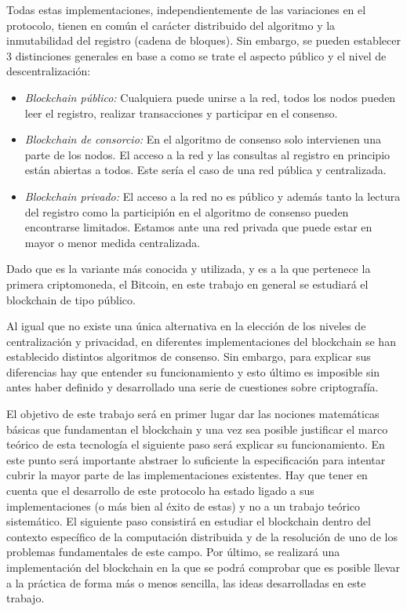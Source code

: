 Todas estas implementaciones, independientemente de las variaciones en el protocolo, tienen en común el carácter distribuido del algoritmo y la inmutabilidad del registro (cadena de bloques). Sin embargo, se pueden establecer 3 distinciones generales en base a como se trate el aspecto público y el nivel de  descentralización:
\begin{itemize}
\item \textit{Blockchain público:} Cualquiera puede unirse a la red, todos los nodos pueden leer el registro, realizar transacciones y participar en el consenso.
\item \textit{Blockchain de consorcio:} En el algoritmo de consenso solo intervienen una parte de los nodos. El acceso a la red y las consultas al registro en principio están abiertas a todos. Este sería el caso de una red pública y centralizada.
\item \textit{Blockchain privado:} El acceso a la red no es público y además tanto la lectura del registro como la participión en el algoritmo de consenso pueden encontrarse limitados. Estamos ante una red privada que puede estar en mayor o menor medida centralizada.
\end{itemize}

Dado que es la variante más conocida y utilizada, y es a la que pertenece la primera criptomoneda, el Bitcoin, en este trabajo en general se estudiará el blockchain de tipo público.

Al igual que no existe una única alternativa en la elección de los niveles de centralización y privacidad, en diferentes implementaciones del blockchain se han establecido distintos algoritmos de consenso. Sin embargo, para explicar sus diferencias hay que entender su funcionamiento y esto último es imposible sin antes haber definido y desarrollado una serie de cuestiones sobre criptografía.%

El objetivo de este trabajo será en primer lugar dar las nociones matemáticas básicas que fundamentan el blockchain y una vez sea posible justificar el marco teórico de esta tecnología el siguiente paso será explicar su funcionamiento. En este punto será importante abstraer lo suficiente la especificación para intentar cubrir la mayor parte de las implementaciones existentes. Hay que tener en cuenta que el desarrollo de este protocolo ha estado ligado a sus implementaciones (o más bien al éxito de estas) y no a un trabajo teórico sistemático. El siguiente paso consistirá en estudiar el blockchain dentro del contexto específico de la computación distribuida y de la resolución de uno de los problemas fundamentales de este campo. Por último, se realizará una implementación del blockchain en la que se podrá comprobar que es posible llevar a la práctica de forma más o menos sencilla, las ideas desarrolladas en este trabajo.

